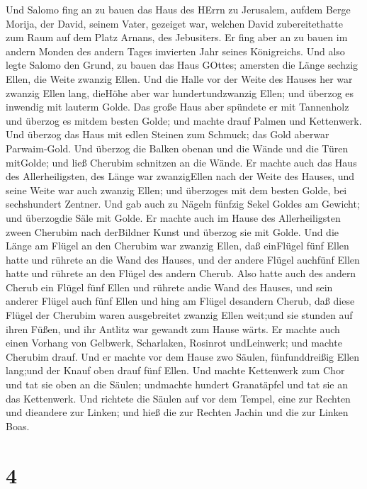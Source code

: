  Und Salomo fing an zu bauen das Haus des HErrn zu
Jerusalem, aufdem Berge Morija, der David, seinem Vater, gezeiget war,
welchen David zubereitethatte zum Raum auf dem Platz Arnans, des
Jebusiters.  Er fing aber an zu bauen im andern Monden des
andern Tages imvierten Jahr seines Königreichs.  Und also
legte Salomo den Grund, zu bauen das Haus GOttes; amersten die Länge
sechzig Ellen, die Weite zwanzig Ellen.  Und die Halle vor
der Weite des Hauses her war zwanzig Ellen lang, dieHöhe aber war
hundertundzwanzig Ellen; und überzog es inwendig mit lauterm Golde.
 Das große Haus aber spündete er mit Tannenholz und überzog
es mitdem besten Golde; und machte drauf Palmen und Kettenwerk.
 Und überzog das Haus mit edlen Steinen zum Schmuck; das
Gold aberwar Parwaim-Gold.  Und überzog die Balken obenan
und die Wände und die Türen mitGolde; und ließ Cherubim schnitzen an die
Wände.  Er machte auch das Haus des Allerheiligsten, des
Länge war zwanzigEllen nach der Weite des Hauses, und seine Weite war
auch zwanzig Ellen; und überzoges mit dem besten Golde, bei sechshundert
Zentner.  Und gab auch zu Nägeln fünfzig Sekel Goldes am
Gewicht; und überzogdie Säle mit Golde.  Er machte auch im
Hause des Allerheiligsten zween Cherubim nach derBildner Kunst und
überzog sie mit Golde.  Und die Länge am Flügel an den
Cherubim war zwanzig Ellen, daß einFlügel fünf Ellen hatte und rührete
an die Wand des Hauses, und der andere Flügel auchfünf Ellen hatte und
rührete an den Flügel des andern Cherub.  Also hatte auch
des andern Cherub ein Flügel fünf Ellen und rührete andie Wand des
Hauses, und sein anderer Flügel auch fünf Ellen und hing am Flügel
desandern Cherub,  daß diese Flügel der Cherubim waren
ausgebreitet zwanzig Ellen weit;und sie stunden auf ihren Füßen, und ihr
Antlitz war gewandt zum Hause wärts.  Er machte auch einen
Vorhang von Gelbwerk, Scharlaken, Rosinrot undLeinwerk; und machte
Cherubim drauf.  Und er machte vor dem Hause zwo Säulen,
fünfunddreißig Ellen lang;und der Knauf oben drauf fünf Ellen.
 Und machte Kettenwerk zum Chor und tat sie oben an die
Säulen; undmachte hundert Granatäpfel und tat sie an das Kettenwerk.
 Und richtete die Säulen auf vor dem Tempel, eine zur
Rechten und dieandere zur Linken; und hieß die zur Rechten Jachin und
die zur Linken Boas.

\hypertarget{section-3}{%
\section{4}\label{section-3}}

